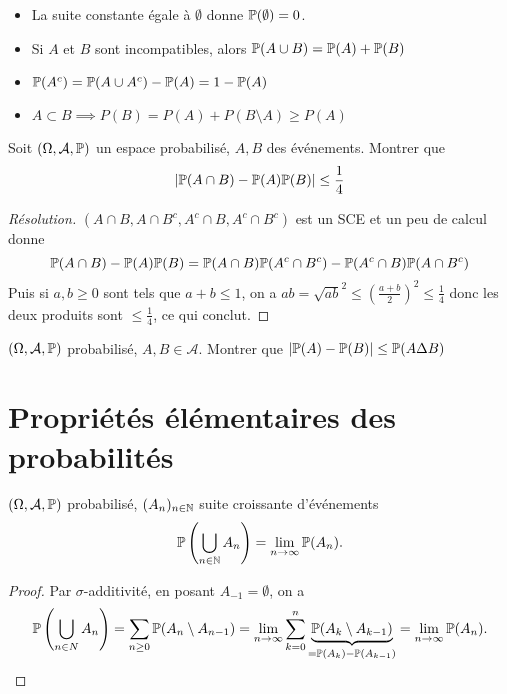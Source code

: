 \begin{rem}
    \begin{itemize}
        \item La suite constante égale à $\emptyset$ donne $\P(\emptyset)=0$.
        \item Si $A$ et $B$ sont incompatibles, alors $\P(A\cup B)=\P(A)+\P(B)$ 
        \item $\P(A^c)=\P(A\cup A^c)-\P(A)=1-\P(A)$
        \item $A\subset B \implies P(B)=P(A)+P(B\setminus A)\geq P(A)$
    \end{itemize}
\end{rem}

\begin{exo}
    Soit $(\Omega, \mathcal A, \P)$ un espace probabilisé, $A, B$ des événements. Montrer que \[
        |\P(A\cap B)-\P(A)\P(B)|\leq \frac{1}{4}
    \]
\end{exo}

\begin{proof}[Résolution]
    $(A\cap B, A\cap B^c, A^c\cap B, A^c\cap B^c)$ est un SCE et un peu de calcul donne \[
        \P(A\cap B)-\P(A)\P(B)=\P(A\cap B)\P(A^c\cap B^c)-\P(A^c\cap B)\P(A\cap B^c)
    \]
    Puis si $a,b\geq 0$ sont tels que $a+b\leq 1$, on a $ab=\sqrt{ab}^2\leq \left( \frac{a+b}{2} \right) ^2\leq \frac{1}{4}$ donc les deux produits sont $\leq \frac{1}{4}$, ce qui conclut.
\end{proof}

\begin{exo}
    $(\Omega, \mathcal A, \P)$ probabilisé, $A, B \in \mathcal A$. Montrer que $|\P(A)-\P(B)| \leq \P(A\Delta B)$
\end{exo}

\section{Propriétés élémentaires des probabilités}

\begin{thm}
    \Hyp $(\Omega, \mathcal A, \P)$ probabilisé, $(A_n)_{n\in \N}$ suite croissante d'événements
    \Conc \[
        \P\left(\bigcup_{n\in \N}A_n \right)=\lim_{n \to \infty} \P(A_n).
    \]
\end{thm}

\begin{proof} Par $\sigma$-additivité, en posant $A_{-1}=\emptyset$, on a
    \[
        \P\left( \bigcup_{n\in N} A_n \right) =\sum_{n\geq 0}\P(A_n\setminus A_{n-1})= \lim_{n \to \infty} \sum_{k=0}^{n} \underbrace{\P(A_k\setminus A_{k-1})}_{=\P(A_k)-\P(A_{k-1})}=\lim_{n \to \infty} \P(A_n).
    \]
\end{proof}

